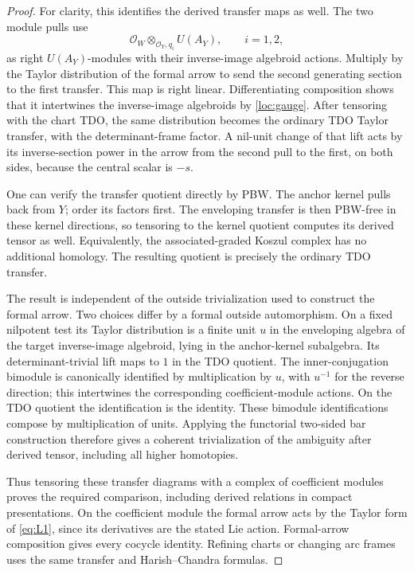 \begin{proof}
For clarity, this identifies the derived transfer maps as well.
The two module pulls use
\[
 \mathcal O_W\otimes_{\mathcal O_Y,q_i}U(A_Y),\qquad i=1,2,
\]
as right $U(A_Y)$-modules with their inverse-image algebroid actions.
Multiply by the Taylor distribution of the formal arrow to send the
second generating section to the first transfer.  This map is right
linear.  Differentiating composition shows that it intertwines the
inverse-image algebroids by \eqref{loc:gauge}.  After tensoring with
the chart TDO, the same distribution becomes the ordinary TDO Taylor
transfer, with the determinant-frame factor.  A nil-unit change of
that lift acts by its inverse-section power in the arrow from the
second pull to the first, on both sides, because the central scalar is
$-s$.

One can verify the transfer quotient directly by PBW.  The anchor
kernel pulls back from $Y$; order its factors first.  The enveloping
transfer is then PBW-free in these kernel directions, so tensoring to
the kernel quotient computes its derived tensor as well.  Equivalently,
the associated-graded Koszul complex has no additional homology.
The resulting quotient is precisely the ordinary TDO transfer.

The result is independent of the outside trivialization used to
construct the formal arrow.  Two choices differ by a formal outside
automorphism.  On a fixed nilpotent test its Taylor distribution is
a finite unit $u$ in the enveloping algebra of the target
inverse-image algebroid, lying in the anchor-kernel subalgebra.
Its determinant-trivial lift maps to $1$ in the TDO quotient.
The inner-conjugation bimodule is canonically identified by
multiplication by $u$, with $u^{-1}$ for the reverse direction;
this intertwines the corresponding coefficient-module actions.
On the TDO quotient the identification is the identity.  These
bimodule identifications compose by multiplication of units.
Applying the functorial two-sided bar construction therefore gives
a coherent trivialization of the ambiguity after derived tensor,
including all higher homotopies.

Thus tensoring these transfer diagrams with a complex of coefficient
modules proves the required comparison, including derived relations
in compact presentations.  On the coefficient module the formal
arrow acts by the Taylor form of \eqref{eq:L1}, since its derivatives
are the stated Lie action.  Formal-arrow composition gives every
cocycle identity.  Refining charts or changing arc frames uses the
same transfer and Harish--Chandra formulas.


\end{proof}
